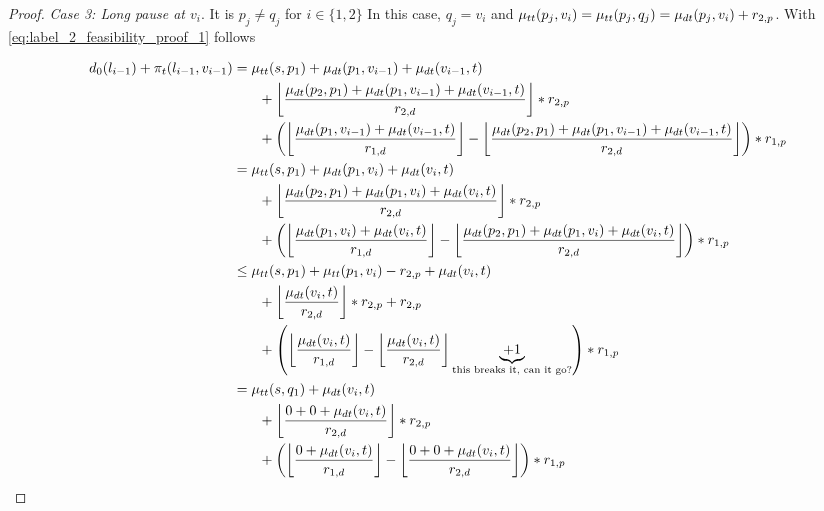 \begin{proof}
	\emph{Case 3: Long pause at $v_i$}. It is $p_j \neq q_j$ for $i \in \{1,2\}$ In this case, $q_j = v_i$ and $\mu_{tt}(p_j,v_i) = \mu_{tt}(p_j,q_j) = \mu_{dt}(p_j,v_i) + r_{2,p}$. With \ref{eq:label_2_feasibility_proof_1} follows

	\begin{align}
		\begin{split}\label{eq:label_2_feasibility_proof_5}
			d_0(l_{i-1}) + \pi_t(l_{i-1},v_{i-1}) &= \traveltime(s, p_1) + \drivingtime(p_1,v_{i-1}) + \drivingtime(v_{i-1},t)\\
			& \phantom{{}=1} + \floor*{ \frac{\drivingtime(p_2,p_1) + \drivingtime(p_1,v_{i-1}) + \drivingtime(v_{i-1},t)}{\restr_{2,d}} } * \restr_{2,p}\\
			& \phantom{{}=1} + \left( \floor*{ \frac{\drivingtime(p_1,v_{i-1})  + \drivingtime(v_{i-1},t)}{\restr_{1,d}} } - \floor*{ \frac{\drivingtime(p_2,p_1) + \drivingtime(p_1,v_{i-1}) + \drivingtime(v_{i-1},t)}{\restr_{2,d}} }\right) * \restr_{1,p}\\
			&= \traveltime(s, p_1) + \drivingtime(p_1,v_{i}) + \drivingtime(v_{i},t)\\
			& \phantom{{}=1} + \floor*{ \frac{\drivingtime(p_2,p_1) + \drivingtime(p_1,v_{i}) + \drivingtime(v_{i},t)}{\restr_{2,d}} } * \restr_{2,p}\\
			& \phantom{{}=1} + \left( \floor*{ \frac{\drivingtime(p_1,v_{i})  + \drivingtime(v_{i},t)}{\restr_{1,d}} } - \floor*{ \frac{\drivingtime(p_2,p_1) + \drivingtime(p_1,v_{i}) + \drivingtime(v_{i},t)}{\restr_{2,d}} }\right) * \restr_{1,p}\\
			&\le \traveltime(s, p_1) + \traveltime(p_1,v_{i}) - r_{2,p} + \drivingtime(v_{i},t)\\
			& \phantom{{}=1} + \floor*{ \frac{\drivingtime(v_{i},t)}{\restr_{2,d}} } * \restr_{2,p} + \restr_{2,p}\\
			& \phantom{{}=1} + \left( \floor*{ \frac{\drivingtime(v_{i},t)} {\restr_{1,d}} } - \floor*{\frac{\drivingtime(v_{i},t)}{\restr_{2,d}} } \underbrace{+ 1}_\text{this breaks it, can it go?} \right) * \restr_{1,p}\\
			&= \traveltime(s, q_1) + \drivingtime(v_{i},t)\\
			& \phantom{{}=1} + \floor*{ \frac{0 + 0 + \drivingtime(v_{i},t)}{\restr_{2,d}} } * \restr_{2,p}\\
			& \phantom{{}=1} + \left( \floor*{ \frac{0 + \drivingtime(v_{i},t)} {\restr_{1,d}} } - \floor*{\frac{0 + 0 + \drivingtime(v_{i},t)}{\restr_{2,d}} } \right) * \restr_{1,p}\\

\end{split}
\end{align}
\end{proof}
